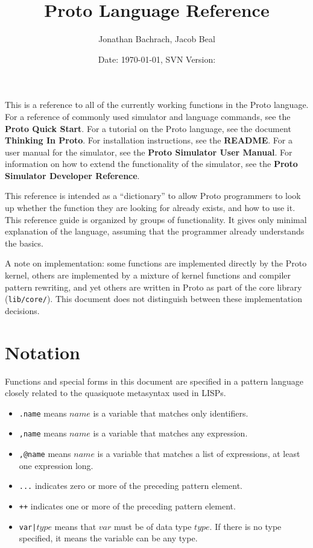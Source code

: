 \documentclass{article}
\title{Proto Language Reference}
\author{Jonathan Bachrach, Jacob Beal}
\date{Date: \today, SVN Version: \svnrev{}}
\newcommand\type[1]{$#1$}
\begin{document}
\maketitle

This is a reference to all of the currently working functions in the
Proto language.  For a reference of commonly used simulator and
language commands, see the {\bf Proto Quick Start}.  For a tutorial on
the Proto language, see the document {\bf Thinking In Proto}.  For
installation instructions, see the {\bf README}.
For a user manual for the simulator, see the {\bf Proto Simulator User
  Manual}.  For information on how to extend the functionality of the
simulator, see the {\bf Proto Simulator Developer Reference}.

This reference is intended as a ``dictionary'' to allow Proto
programmers to look up whether the function they are looking for
already exists, and how to use it.  This reference guide is organized
by groups of functionality.  It gives only minimal explanation of the
language, assuming that the programmer already understands the basics.

A note on implementation: some functions are implemented directly by
the Proto kernel, others are implemented by a mixture of kernel
functions and compiler pattern rewriting, and yet others are written
in Proto as part of the core library ({\tt lib/core/}).  This document
does not distinguish between these implementation decisions.




\section{Notation}

Functions and special forms in this document are specified in a
pattern language closely related to the quasiquote metasyntax used in
LISPs.
\begin{itemize}
\item {\tt .name} means $name$ is a variable that matches only identifiers. 
\item {\tt ,name} means $name$ is a variable that matches any expression.
\item {\tt ,@name} means $name$ is a variable that matches a list of
  expressions, at least one expression long.
\item {\tt ...} indicates zero or more of the preceding pattern element.
\item {\tt ++} indicates one or more of the preceding pattern element.
\item {\tt var|\type{type}} means that $var$ must be of data type
  $type$.  If there is no type specified, it means the variable can be
  any type.
\end{itemize}
\end{document}
